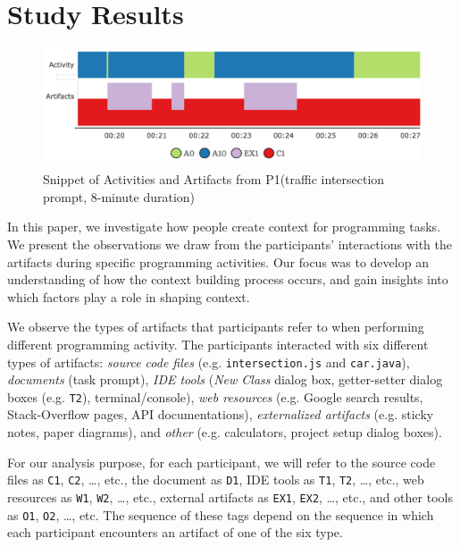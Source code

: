 
\section{Study Results}



\begin{figure}
\includegraphics[width=\columnwidth]{figures/P1timeplot}
\caption{Snippet of Activities and Artifacts from P1(traffic intersection prompt, 8-minute duration)}
\label{P1Fig}
\end{figure}

In this paper, we investigate how people create context for programming tasks. We present the observations we draw from the participants' interactions with the artifacts during specific programming activities. Our focus was to develop an understanding of how the context building process occurs, and gain insights into which factors play a role in shaping context.


We observe the types of artifacts that participants refer to when performing different programming activity. The participants interacted with six different types of artifacts: \textit{source code files} (e.g. \texttt{intersection.js} and \texttt{car.java}), \textit{documents} (task prompt), \textit{IDE tools} (\textit{New Class} dialog box, getter-setter dialog boxes (e.g. \texttt{T2}), terminal/console),\textit{ web resources} (e.g. Google search results, Stack-Overflow pages, API documentations), \textit{externalized artifacts} (e.g. sticky notes, paper diagrams), and \textit{other} (e.g. calculators, project setup dialog boxes).

For our analysis purpose, for each participant, we will refer to the source code files as \texttt{C1}, \texttt{C2}, \ldots , etc., the document as \texttt{D1}, IDE tools as \texttt{T1}, \texttt{T2}, \ldots, etc., web resources as \texttt{W1}, \texttt{W2}, \ldots, etc., external artifacts as \texttt{EX1}, \texttt{EX2}, \ldots, etc., and other tools as \texttt{O1}, \texttt{O2}, \ldots, etc. The sequence of these tags depend on the sequence in which each participant encounters an artifact of one of the six type. 

